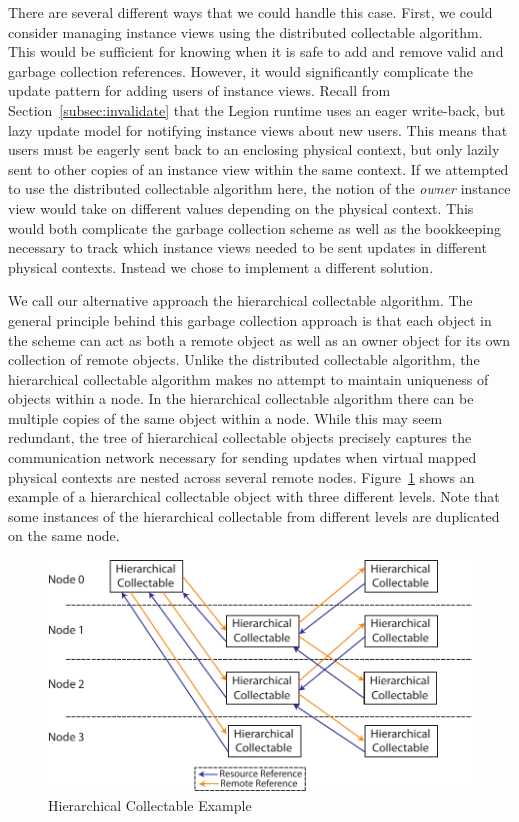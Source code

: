 There are several different ways that we could handle
this case.  First, we could consider managing instance
views using the distributed collectable algorithm. 
This would be sufficient for knowing when it is safe
to add and remove valid and garbage collection references.
However, it would significantly complicate the update
pattern for adding users of instance views. Recall from
Section~\ref{subsec:invalidate} that the Legion runtime
uses an eager write-back, but lazy update model for
notifying instance views about new users. This means
that users must be eagerly sent back to an enclosing
physical context, but only lazily sent to other copies
of an instance view within the same context. If we
attempted to use the distributed collectable algorithm
here, the notion of the {\em owner} instance view 
would take on different values depending on the 
physical context. This would both complicate the 
garbage collection scheme as well as the bookkeeping
necessary to track which instance views needed to
be sent updates in different physical contexts.
Instead we chose to implement a different solution.

We call our alternative approach the hierarchical
collectable algorithm.  The general principle 
behind this garbage collection approach is that
each object in the scheme can act as both a remote
object as well as an owner object for its own
collection of remote objects. Unlike the distributed
collectable algorithm, the hierarchical collectable
algorithm makes no attempt to maintain uniqueness
of objects within a node.  In the hierarchical 
collectable algorithm there can be multiple copies
of the same object within a node.  While this may
seem redundant, the tree of hierarchical collectable
objects precisely captures the communication
network necessary for sending updates when virtual
mapped physical contexts are nested across several
remote nodes. Figure~\ref{fig:hiergc} shows an 
example of a hierarchical collectable object with
three different levels. Note that some instances
of the hierarchical collectable from different
levels are duplicated on the same node.

\begin{figure}
\centering
\includegraphics[scale=0.75]{figs/HierarchicalCollectable.pdf}
\caption{Hierarchical Collectable Example\label{fig:hiergc}}
\end{figure}

